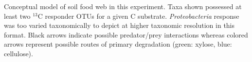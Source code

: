 Conceptual model of soil food web in this experiment. Taxa shown possessed at least two $^{13}$C responder OTUs for a given C substrate. \textit{Proteobacteria} response was too varied taxonomically to depict at higher taxonomic resolution in this format. Black arrows indicate possible predator/prey interactions whereas colored arrows represent possible routes of primary degradation (green: xylose, blue: cellulose).